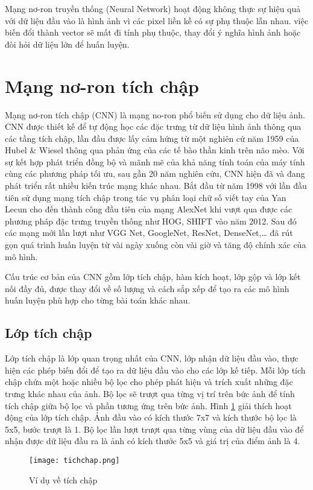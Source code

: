 \documentclass[../the.tex]{subfiles}
\begin{document}
{\fontsize{13}{12} \selectfont

	Mạng nơ-ron truyền thống (Neural Network) hoạt động không thực sự hiệu quả với dữ liệu đầu vào là hình ảnh vì các pixel liền kề có sự phụ thuộc lẫn nhau.
	việc biến đổi thành vector sẽ mất đi tính phụ thuộc, thay đổi ý nghĩa hình ảnh hoặc đòi hỏi dữ liệu lớn để huấn luyện.

}

\section{Mạng nơ-ron tích chập }
\label{sec:cnn}

{\fontsize{13}{12} \selectfont
	Mạng nơ-ron tích chập (CNN) là mạng no-ron phổ biến sử dụng cho dữ liệu ảnh.
	CNN được thiết kế để tự động học các đặc trưng từ dữ liệu hình ảnh thông qua các tầng tích chập, lần đầu được lấy cảm hứng từ một nghiên cứ năm 1959 của Hubel \& Wiesel \cite{hubel1962receptive} thông qua phản ứng của các tế bào thần kinh trên não mèo. Với sự kết hợp phát triển đồng bộ và mãnh mẽ của khả năng tính toán của máy tính cùng các phương pháp tối ưu,
	sau gần 20 năm nghiên cứu, CNN hiện đã và đang phát triển rất nhiều kiến trúc mạng khác nhau. Bắt đầu từ năm 1998 với lần đầu tiên sử dụng mạng tích chập trong tác vụ phân loại chữ số viết tay của Yan Lecun
	\cite{lecun1998gradient} cho đến thành công đầu tiên của mạng AlexNet khi vượt qua được các phương pháp đặc trưng truyền thống như HOG, SHIFT vào năm 2012. Sau đó các mạng mới lần lượt như VGG Net, GoogleNet, ResNet, DenseNet,\dots
	đã rút gọn quá trình huấn luyện từ vài ngày xuống còn vài giờ và tăng độ chính xác của mô hình.
}

\bigskip

{\fontsize{13}{12} \selectfont
	Cấu trúc cơ bản của CNN gồm lớp tích chập, hàm kích hoạt, lớp gộp và lớp kết nối đầy đủ, được thay đổi về số lượng và cách sắp xếp để tạo ra các mô hình huấn luyện phù hợp cho từng bài toán khác nhau.
}

\subsection{Lớp tích chập}

{\fontsize{13}{12} \selectfont
	Lớp tích chập là lớp quan trọng nhất của CNN, lớp nhận dữ liệu đầu vào, thực hiện các phép biến đổi để tạo ra dữ liệu đầu vào cho các lớp kế tiếp. Mỗi lớp tích chập chứa một hoặc nhiều bộ lọc cho phép phát hiện và trích xuất những đặc trưng khác nhau của ảnh.
	Bộ lọc sẽ trượt qua từng vị trí trên bức ảnh để tính tích chập giữa bộ lọc và phần tương ứng trên bức ảnh.
	Hình \ref{fig:hinh_tichchap} giải thích hoạt động của lớp tích chập. Ảnh đầu vào có kích thước 7x7 và kích thước bộ lọc là 5x5, bước trượt là 1. Bộ lọc lần lượt trượt qua từng vùng của dữ liệu đầu vào để nhận được
	dữ liệu đầu ra là ảnh có kích thước 5x5 và giá trị của điểm ảnh là 4.
}
\begin{figure}[H]
	\centering
	\texttt{[image: tichchap.png]}
	\caption{Ví dụ về tích chập}
	\label{fig:hinh_tichchap}
\end{figure}
\end{document}
